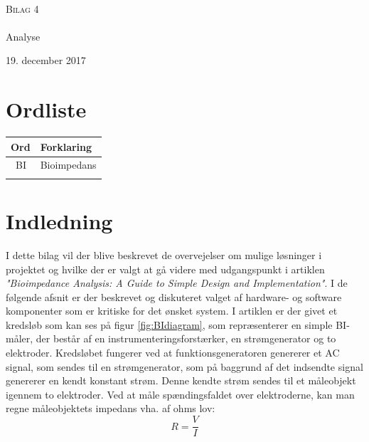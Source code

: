 



\begin{titlingpage}
\begin{center}

~ \\[3cm]


\textsc{\LARGE Bilag 4}\\[1.5cm]


\noindent\makebox[\linewidth]{\rule{\textwidth}{0.4pt}}\\
[0.5cm]{\Huge Analyse}
\noindent\makebox[\linewidth]{\rule{\textwidth}{0.4pt}}
\end{center}
\vfill
\begin{center}
{\large 19. december 2017}
\end{center}
\end{titlingpage}



\newpage
\tableofcontents*
\newpage
\chapter{Ordliste}

\begin{longtabu} to 
    Ord &    Forklaring\\
    \toprule \
   BI 	&    Bioimpedans \\
    
 
\label{forkort}
\end{longtabu}

\chapter{Indledning}

I dette bilag vil der blive beskrevet de overvejelser om mulige løsninger i projektet og hvilke der er valgt at gå videre med udgangspunkt i artiklen \textit{"Bioimpedance Analysis: A Guide to Simple Design and Implementation"}. I de følgende afsnit er der beskrevet og diskuteret valget af hardware- og software komponenter som er kritiske for det ønsket system. I artiklen er der givet et kredsløb som kan ses på figur \ref{fig:BIdiagram}, som repræsenterer en simple BI-måler, der består af en instrumenteringsforstærker, en strømgenerator og to elektroder. Kredsløbet fungerer ved at funktionsgeneratoren genererer et AC signal, som sendes til en strømgenerator, som på baggrund af det indsendte signal genererer en kendt konstant strøm. Denne kendte strøm sendes til et måleobjekt igennem to elektroder. Ved at måle spændingsfaldet over elektroderne, kan man regne måleobjektets impedans vha. af ohms lov: $$R=\frac{V}{I}$$

